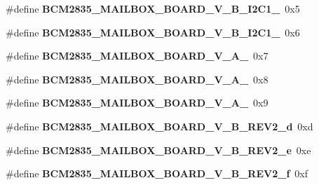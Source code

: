 \begin{DoxyCompactItemize}
\mbox{\label{group__raspberrypi__vc_ga44787e1d7380128d03ae51fcbad28eda}} 
\#define {\bfseries B\+C\+M2835\+\_\+\+M\+A\+I\+L\+B\+O\+X\+\_\+\+B\+O\+A\+R\+D\+\_\+\+V\+\_\+\+B\+\_\+\+I2\+C1\+\_}~0x5
\item 
\mbox{\label{group__raspberrypi__vc_gaa9a5524cee81cf9f83436c9cf7add3dd}} 
\#define {\bfseries B\+C\+M2835\+\_\+\+M\+A\+I\+L\+B\+O\+X\+\_\+\+B\+O\+A\+R\+D\+\_\+\+V\+\_\+\+B\+\_\+\+I2\+C1\+\_}~0x6
\item 
\mbox{\label{group__raspberrypi__vc_gafe929e47a31cfbf174248a5fc856c7ce}} 
\#define {\bfseries B\+C\+M2835\+\_\+\+M\+A\+I\+L\+B\+O\+X\+\_\+\+B\+O\+A\+R\+D\+\_\+\+V\+\_\+\+A\+\_}~0x7
\item 
\mbox{\label{group__raspberrypi__vc_ga65935f931840f91cd8e19eaeb15967a6}} 
\#define {\bfseries B\+C\+M2835\+\_\+\+M\+A\+I\+L\+B\+O\+X\+\_\+\+B\+O\+A\+R\+D\+\_\+\+V\+\_\+\+A\+\_}~0x8
\item 
\mbox{\label{group__raspberrypi__vc_ga401dbcb5ba9e761ae3be00e324771856}} 
\#define {\bfseries B\+C\+M2835\+\_\+\+M\+A\+I\+L\+B\+O\+X\+\_\+\+B\+O\+A\+R\+D\+\_\+\+V\+\_\+\+A\+\_}~0x9
\item 
\mbox{\label{group__raspberrypi__vc_ga3000fb594f0cd1ce3001b2bbfe2cc692}} 
\#define {\bfseries B\+C\+M2835\+\_\+\+M\+A\+I\+L\+B\+O\+X\+\_\+\+B\+O\+A\+R\+D\+\_\+\+V\+\_\+\+B\+\_\+\+R\+E\+V2\+\_\+d}~0xd
\item 
\mbox{\label{group__raspberrypi__vc_gaf1ee7426ce53fd72b1e9a12ec05c034f}} 
\#define {\bfseries B\+C\+M2835\+\_\+\+M\+A\+I\+L\+B\+O\+X\+\_\+\+B\+O\+A\+R\+D\+\_\+\+V\+\_\+\+B\+\_\+\+R\+E\+V2\+\_\+e}~0xe
\item 
\mbox{\label{group__raspberrypi__vc_ga2e529e360153f9f3aa79172dc0a0b5b4}} 
\#define {\bfseries B\+C\+M2835\+\_\+\+M\+A\+I\+L\+B\+O\+X\+\_\+\+B\+O\+A\+R\+D\+\_\+\+V\+\_\+\+B\+\_\+\+R\+E\+V2\+\_\+f}~0xf
\item 
\mbox{\label{group__raspberrypi__vc_gac1b7cc82edb41d5c7a6e8917f610cdec}} 

\end{DoxyCompactItemize}
